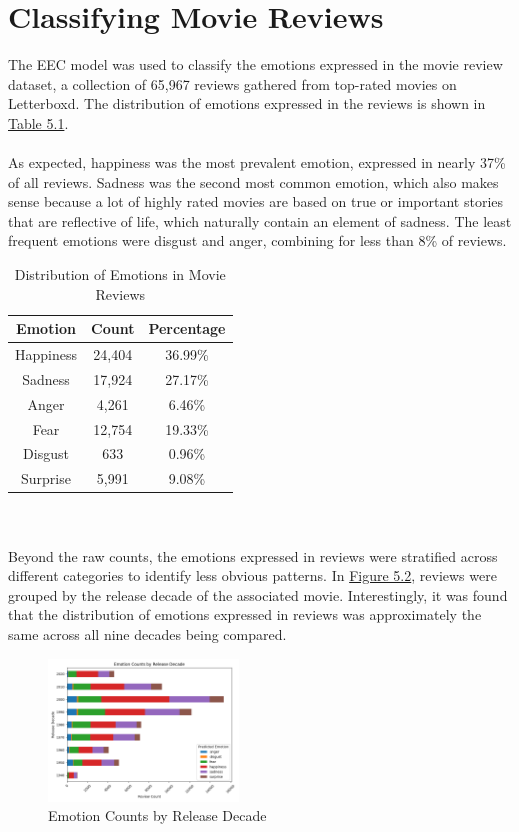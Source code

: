 \documentclass[11pt]{article}
\begin{document}
\section{Classifying Movie Reviews}
The EEC model was used to classify the emotions expressed in the movie review dataset, a collection of 65,967 reviews gathered from top-rated movies on Letterboxd. The distribution of emotions expressed in the reviews is shown in \hyperref[tab:movie_review_distribution]{Table 5.1}.  \\ \\
As expected, happiness was the most prevalent emotion, expressed in nearly 37\% of all reviews. Sadness was the second most common emotion, which also makes sense because a lot of highly rated movies are based on true or important stories that are reflective of life, which naturally contain an element of sadness. The least frequent emotions were disgust and anger, combining for less than 8\% of reviews.
\renewcommand{\thetable}{5.1}
\begin{table}[h]
    	\centering
    	\begin{tabular}{c c c}
        		\toprule
        		\textbf{Emotion} & \textbf{Count} & \textbf{Percentage} \\
        		\midrule
        		Happiness & 24,404 & 36.99\% \\
        		Sadness & 17,924 & 27.17\% \\
        		Anger & 4,261 & 6.46\% \\
        		Fear & 12,754 & 19.33\% \\
        		Disgust & 633 & 0.96\% \\
        		Surprise & 5,991 & 9.08\% \\
        		\bottomrule
    	\end{tabular}
    	\caption{Distribution of Emotions in Movie Reviews}
	\label{tab:movie_review_distribution}
\end{table}
\\ \\ Beyond the raw counts, the emotions expressed in reviews were stratified across different categories to identify less obvious patterns. In \hyperref[fig:emotion_counts_by_release_decade]{Figure 5.2}, reviews were grouped by the release decade of the associated movie. Interestingly, it was found that the distribution of emotions expressed in reviews was approximately the same across all nine decades being compared.
\renewcommand{\thefigure}{5.2}
\begin{figure}[h]
	\centering
	\includegraphics[width=0.45\textwidth]{emotion_counts_by_release_decade.png}
	\caption{Emotion Counts by Release Decade}
	\label{fig:emotion_counts_by_release_decade}
\end{figure}
\end{document}

